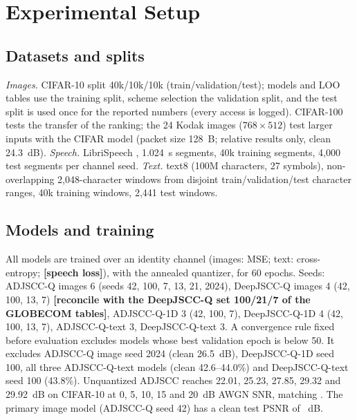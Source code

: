 \documentclass[journal]{IEEEtran}
\providecommand{\TBD}[1]{\textbf{\color{red}[#1]}}
\begin{document}
\section{Experimental Setup}\label{sec:setup}
\subsection{Datasets and splits}
\emph{Images.} CIFAR-10 split 40k/10k/10k (train/validation/test); models and LOO tables use the
training split, scheme selection the validation split, and the test split is used once for the reported
numbers (every access is logged). CIFAR-100 tests the transfer of the ranking; the 24 Kodak images
\cite{kodak} ($768\times512$) test larger inputs with the CIFAR model (packet size 128~B; relative results
only, clean 24.3~dB). \emph{Speech.} LibriSpeech \cite{panayotov2015librispeech}, 1.024~s segments, 40k
training segments, 4,000 test segments per channel seed. \emph{Text.} text8 \cite{mahoney2011text8}
(100M characters, 27 symbols), non-overlapping 2,048-character windows from disjoint train/validation/test
character ranges, 40k training windows, 2,441 test windows.

\subsection{Models and training}
All models are trained over an identity channel (images: MSE; text: cross-entropy; \TBD{speech loss}),
with the annealed quantizer, for 60 epochs. Seeds: ADJSCC-Q images 6 (seeds 42, 100, 7, 13, 21, 2024),
DeepJSCC-Q images 4 (42, 100, 13, 7) \TBD{reconcile with the DeepJSCC-Q set 100/21/7 of the GLOBECOM
tables}, ADJSCC-Q-1D 3 (42, 100, 7), DeepJSCC-Q-1D 4 (42, 100, 13, 7), ADJSCC-Q-text 3, DeepJSCC-Q-text 3.
A convergence rule fixed before evaluation excludes models whose best validation epoch is below 50. It
excludes ADJSCC-Q image seed 2024 (clean 26.5~dB), DeepJSCC-Q-1D seed 100, all three ADJSCC-Q-text models
(clean 42.6--44.0\%) and DeepJSCC-Q-text seed 100 (43.8\%). Unquantized ADJSCC reaches 22.01, 25.23,
27.85, 29.32 and 29.92~dB on CIFAR-10 at 0, 5, 10, 15 and 20~dB AWGN SNR, matching \cite{xu2022adjscc}.
The primary image model (ADJSCC-Q seed 42) has a clean test PSNR of \CleanPsnr~dB.
\end{document}
